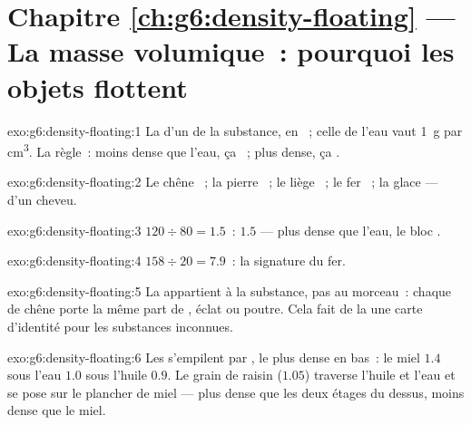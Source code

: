 \section*{Chapitre \ref{ch:g6:density-floating} --- La masse volumique~: pourquoi les objets flottent}

\begin{solution}{exo:g6:density-floating:1}
La  d'un  de la substance, en ~; celle de
l'eau vaut \qty{1}{g} par \unit{cm^3}. La règle~: moins dense que
l'eau, ça ~; plus dense, ça .
\end{solution}

\begin{solution}{exo:g6:density-floating:2}
Le chêne ~; la pierre ~; le liège ~; le fer ~;
la glace  --- d'un cheveu.
\end{solution}

\begin{solution}{exo:g6:density-floating:3}
$120 \div 80 = 1.5$~:  $1.5$ --- plus dense que
l'eau, le bloc .
\end{solution}

\begin{solution}{exo:g6:density-floating:4}
$158 \div 20 = 7.9$~: la signature du fer.
\end{solution}

\begin{solution}{exo:g6:density-floating:5}
La  appartient à la substance, pas au morceau~: chaque
 de chêne porte la même part de , éclat ou
poutre. Cela fait de la  une carte d'identité pour les
substances inconnues.
\end{solution}

\begin{solution}{exo:g6:density-floating:6}
Les  s'empilent par , le plus dense en bas~:
le miel $1.4$ sous l'eau $1.0$ sous l'huile $0.9$. Le grain de raisin
($1.05$) traverse l'huile et l'eau et se pose sur le plancher de
miel --- plus dense que les deux étages du dessus, moins dense que le
miel.
\end{solution}

